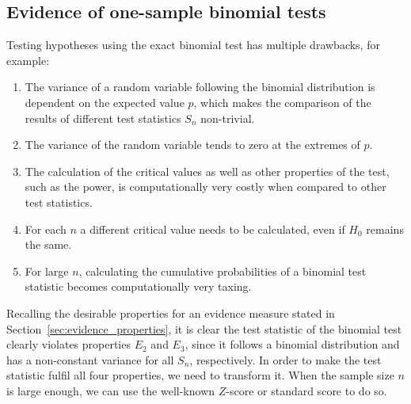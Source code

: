 \subsection{Evidence of one-sample binomial tests}
\label{subsec:ev binomial}
Testing hypotheses using the exact binomial test has multiple drawbacks, for example: 
\begin{enumerate}
    \item The variance of a random variable following the binomial distribution is dependent on the expected value $p$, which makes the comparison of the results of different test statistics $S_n$ non-trivial. 
    \item The variance of the random variable tends to zero at the extremes of $p$. 
    \item The calculation of the critical values as well as other properties of the test, such as the power, is computationally very costly when compared to other test statistics. 
    \item For each $n$ a different critical value needs to be calculated, even if $H_0$ remains the same.
    \item For large $n$, calculating the cumulative probabilities of a binomial test statistic becomes computationally very taxing.
\end{enumerate}

Recalling the desirable properties for an evidence measure stated in Section~\ref{sec:evidence_properties}, it is clear the test statistic of the binomial test clearly violates properties $E_2$ and $E_3$, since it follows a binomial distribution and has a non-constant variance for all $S_n$, respectively. In order to make the test statistic fulfil all four properties, we need to transform it. When the sample size $n$ is large enough, we can use the well-known $Z$-score or standard score to do so. 

